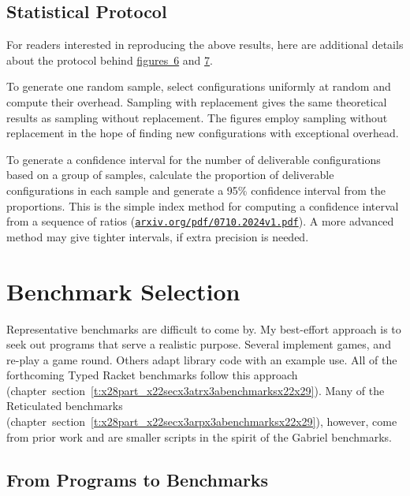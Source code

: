 \documentclass[ twoside,open=right,titlepage,numbers=noenddot,headinclude,%
                footinclude=true,cleardoublepage=empty,abstract=off,
                BCOR=5mm,paper=a4,fontsize=11pt,%
                ngerman,american,%
                parts,pdfspacing]{scrreprt}
\newcommand{\SecRef}[2]{section~#1}
\newcommand{\SecRefLocal}[3]{\hyperref[#1]{\SecRef{#2}{#3}}}
\let\SOriginalthesubsubsection\thesubsubsection
\newcommand{\Ssubsection}[2]{\subsection[#1]{#2}\let\thesubsubsection\SOriginalthesubsubsection}
\newcommand{\Ssubsubsection}[2]{\subsubsection[#1]{#2}}
\newcommand{\Snolinkurl}[1]{\nolinkurl{#1}}
\newcommand{\FigureRef}[2]{#1}
\renewcommand{\Ssubsection}[2]{\section[#1]{#2}}
\renewcommand{\Ssubsubsection}[2]{\subsection[#1]{#2}}
\renewcommand{\SecRefLocal}[3]{section~\ref{#1}}
\begin{document}
\Ssubsubsection{Statistical Protocol}{Statistical Protocol}\label{t:x28part_x22Statisticalx5fProtocolx22x29}

For readers interested in reproducing the above results, here are
 additional details about
 the protocol behind \hyperref[t:x28counter_x28x22figurex22_x22figx3atrx3avalidatex2dsamplex22x29x29]{figures~\FigureRef{6}{t:x28counter_x28x22figurex22_x22figx3atrx3avalidatex2dsamplex22x29x29}} and \hyperref[t:x28counter_x28x22figurex22_x22figx3arpx3avalidatex2dsamplex22x29x29]{\FigureRef{7}{t:x28counter_x28x22figurex22_x22figx3arpx3avalidatex2dsamplex22x29x29}}.

To generate one random sample, select  configurations
 uniformly at random and compute their overhead.
Sampling with replacement gives the same theoretical results as sampling
 without replacement.
The figures employ sampling without replacement in the hope of finding
 new configurations with exceptional overhead.

To generate a confidence interval for the number of deliverable
 configurations based on a group of samples, calculate
 the proportion of deliverable configurations in each sample and generate
 a 95\% confidence interval from the proportions.
This is the simple index method for computing a
 confidence interval from a sequence of ratios (\href{https://arxiv.org/pdf/0710.2024v1.pdf}{\Snolinkurl{arxiv.org/pdf/0710.2024v1.pdf}}).
A more advanced method may give tighter intervals, if extra precision is needed.

\Ssubsection{Benchmark Selection}{Benchmark Selection}\label{t:x28part_x22Benchmarkx5fSelectionx22x29}

Representative benchmarks are difficult to come by.
My best{-}effort approach is to seek out programs that serve a realistic
 purpose.
Several implement games, and re{-}play a game round.
Others adapt library code with an example use.
All of the forthcoming Typed Racket benchmarks follow this approach (chapter~\SecRefLocal{t:x28part_x22secx3atrx3abenchmarksx22x29}{3.5.2}{Benchmarks}).
Many of the Reticulated benchmarks (chapter~\SecRefLocal{t:x28part_x22secx3arpx3abenchmarksx22x29}{3.6.2}{Benchmarks}), however, come from prior work and
 are smaller scripts in the spirit of the Gabriel benchmarks.

\Ssubsubsection{From Programs to Benchmarks}{From Programs to Benchmarks}\label{t:x28part_x22secx3aconversionx22x29}
\end{document}
